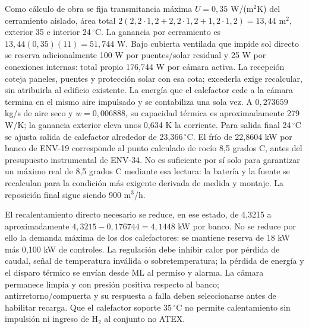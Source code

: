 Como cálculo de obra se fija transmitancia máxima $U=0,35$ W/(m$^2$K) del cerramiento aislado, área total $2(2,2\cdot1,2+2,2\cdot1,2+1,2\cdot1,2)=13,44$ m$^2$, exterior 35 e interior 24\,$^{\circ}$C. La ganancia por cerramiento es $13,44(0,35)(11)=51,744$ W. Bajo cubierta ventilada que impide sol directo se reserva adicionalmente 100 W por puentes/solar residual y 25 W por conexiones internas: total propio 176,744 W por cámara activa. La recepción coteja paneles, puentes y protección solar con esa cota; excederla exige recalcular, sin atribuirla al edificio existente. La energía que el calefactor cede a la cámara termina en el mismo aire impulsado y se contabiliza una sola vez. A $0,273659$ kg/s de aire seco y $w=0,006888$, su capacidad térmica es aproximadamente 279 W/K; la ganancia exterior eleva unos 0,634 K la corriente. Para salida final 24\,$^{\circ}$C se ajusta salida de calefactor alrededor de 23,366\,$^{\circ}$C. El frío de 22,8604 kW por banco de ENV-19 corresponde al punto calculado de rocío 8,5 grados C, antes del presupuesto instrumental de ENV-34. No es suficiente por sí solo para garantizar un máximo real de 8,5 grados C mediante esa lectura: la batería y la fuente se recalculan para la condición más exigente derivada de medida y montaje. La reposición final sigue siendo 900 m$^3$/h.

El recalentamiento directo necesario se reduce, en ese estado, de 4,3215 a aproximadamente $4,3215-0,176744=4,1448$ kW por banco. No se reduce por ello la demanda máxima de los dos calefactores: se mantiene reserva de 18 kW más 0,100 kW de controles. La regulación debe inhibir calor por pérdida de caudal, señal de temperatura inválida o sobretemperatura; la pérdida de energía y el disparo térmico se envían desde ML al permiso y alarma. La cámara permanece limpia y con presión positiva respecto al banco; antirretorno/compuerta y su respuesta a falla deben seleccionarse antes de habilitar recarga. Que el calefactor soporte 35\,$^{\circ}$C no permite calentamiento sin impulsión ni ingreso de H$_2$ al conjunto no ATEX.

